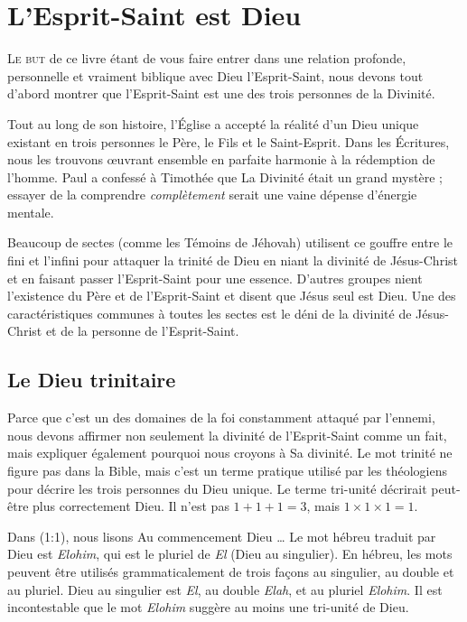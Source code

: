 \chapter{L'Esprit-Saint est Dieu}

\lettrine{L}{e but} de ce livre étant de vous faire entrer
 dans une relation profonde, personnelle et vraiment biblique avec
 Dieu l'Esprit-Saint, nous devons tout d'abord montrer que l'Esprit-Saint
 est une des trois personnes de la Divinité.

Tout au long de son histoire, l'Église a accepté la réalité d'un Dieu unique
 existant en trois personnes\frcolon{} le Père, le Fils et le Saint-Esprit.
 Dans les Écritures, nous les trouvons \oe{}uvrant ensemble en parfaite harmonie
 à la rédemption de l'homme.
 Paul a confessé à Timothée que La Divinité était un grand mystère ;
 essayer de la comprendre \emph{complètement} serait une vaine dépense
 d'énergie mentale.

Beaucoup de sectes (comme les Témoins de Jéhovah) utilisent
 ce gouffre entre le fini et l'infini pour attaquer la trinité de Dieu
 en niant la divinité de Jésus-Christ et en faisant passer l'Esprit-Saint
 pour une essence. D'autres groupes nient l'existence du Père et
 de l'Esprit-Saint et disent que Jésus seul est Dieu.
 Une des caractéristiques communes à toutes les sectes est le déni de la divinité
 de Jésus-Christ et de la personne de l'Esprit-Saint.

\section{Le Dieu trinitaire}

Parce que c'est un des domaines de la foi constamment attaqué par l'ennemi, nous devons
 affirmer non seulement la divinité de l'Esprit-Saint comme un fait,
 mais expliquer également pourquoi nous croyons à Sa divinité.
 Le mot \Og trinité \Fg{} ne figure pas dans la Bible, mais c'est un
 terme pratique utilisé par les théologiens pour décrire les trois personnes
 du Dieu unique.
 Le terme \Og tri-unité \Fg{} décrirait peut-être plus correctement Dieu.
 Il n'est pas $1 + 1 + 1 = 3$, mais $1 \times 1 \times 1 = 1$.

Dans (1:1), nous lisons\frcolon{}
 \Og Au commencement Dieu \dots{} \Fg{}
 Le mot hébreu traduit par \Og Dieu \Fg{} est \emph{Elohim}, qui est
 le pluriel de \emph{El} (Dieu au singulier).
 En hébreu, les mots peuvent être utilisés grammaticalement de trois
 façons\frcolon{} au singulier, au \Og double \Fg{} et au pluriel.
 \Og Dieu \Fg{} au singulier est \emph{El}, au double \emph{Elah},
 et au pluriel \emph{Elohim}.
 Il est incontestable que le mot \emph{Elohim} suggère au moins
 une tri-unité de Dieu.

